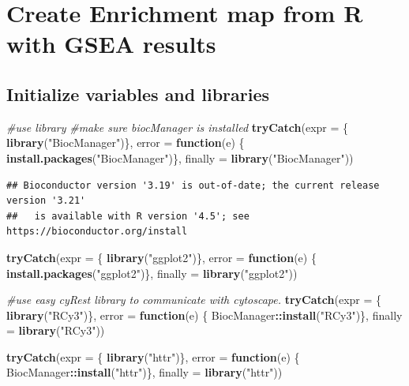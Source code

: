 \documentclass[
]{book}
\newenvironment{Shaded}{\begin{snugshade}}{\end{snugshade}}
\newcommand{\AttributeTok}[1]{\textcolor[rgb]{0.13,0.29,0.53}{#1}}
\newcommand{\CommentTok}[1]{\textcolor[rgb]{0.56,0.35,0.01}{\textit{#1}}}
\newcommand{\ControlFlowTok}[1]{\textcolor[rgb]{0.13,0.29,0.53}{\textbf{#1}}}
\newcommand{\FunctionTok}[1]{\textcolor[rgb]{0.13,0.29,0.53}{\textbf{#1}}}
\newcommand{\NormalTok}[1]{#1}
\newcommand{\SpecialCharTok}[1]{\textcolor[rgb]{0.81,0.36,0.00}{\textbf{#1}}}
\newcommand{\StringTok}[1]{\textcolor[rgb]{0.31,0.60,0.02}{#1}}
\begin{document}
\chapter{Create Enrichment map from R with GSEA results}\label{create-enrichment-map-from-r-with-gsea-results}

\section{Initialize variables and libraries}\label{initialize-variables-and-libraries}

\begin{Shaded}
\begin{Highlighting}[]
\CommentTok{\#use library}
\CommentTok{\#make sure biocManager is installed}
\FunctionTok{tryCatch}\NormalTok{(}\AttributeTok{expr =}\NormalTok{ \{ }\FunctionTok{library}\NormalTok{(}\StringTok{"BiocManager"}\NormalTok{)\}, }
         \AttributeTok{error =} \ControlFlowTok{function}\NormalTok{(e) \{ }
           \FunctionTok{install.packages}\NormalTok{(}\StringTok{"BiocManager"}\NormalTok{)\}, }
         \AttributeTok{finally =} \FunctionTok{library}\NormalTok{(}\StringTok{"BiocManager"}\NormalTok{))}
\end{Highlighting}
\end{Shaded}

\begin{verbatim}
## Bioconductor version '3.19' is out-of-date; the current release version '3.21'
##   is available with R version '4.5'; see https://bioconductor.org/install
\end{verbatim}

\begin{Shaded}
\begin{Highlighting}[]
\FunctionTok{tryCatch}\NormalTok{(}\AttributeTok{expr =}\NormalTok{ \{ }\FunctionTok{library}\NormalTok{(}\StringTok{"ggplot2"}\NormalTok{)\}, }
         \AttributeTok{error =} \ControlFlowTok{function}\NormalTok{(e) \{ }\FunctionTok{install.packages}\NormalTok{(}\StringTok{"ggplot2"}\NormalTok{)\}, }
         \AttributeTok{finally =} \FunctionTok{library}\NormalTok{(}\StringTok{"ggplot2"}\NormalTok{))}

\CommentTok{\#use easy cyRest library to communicate with cytoscape.}
\FunctionTok{tryCatch}\NormalTok{(}\AttributeTok{expr =}\NormalTok{ \{ }\FunctionTok{library}\NormalTok{(}\StringTok{"RCy3"}\NormalTok{)\}, }
         \AttributeTok{error =} \ControlFlowTok{function}\NormalTok{(e) \{ BiocManager}\SpecialCharTok{::}\FunctionTok{install}\NormalTok{(}\StringTok{"RCy3"}\NormalTok{)\}, }
         \AttributeTok{finally =} \FunctionTok{library}\NormalTok{(}\StringTok{"RCy3"}\NormalTok{))}

\FunctionTok{tryCatch}\NormalTok{(}\AttributeTok{expr =}\NormalTok{ \{ }\FunctionTok{library}\NormalTok{(}\StringTok{"httr"}\NormalTok{)\}, }
         \AttributeTok{error =} \ControlFlowTok{function}\NormalTok{(e) \{ BiocManager}\SpecialCharTok{::}\FunctionTok{install}\NormalTok{(}\StringTok{"httr"}\NormalTok{)\}, }
         \AttributeTok{finally =} \FunctionTok{library}\NormalTok{(}\StringTok{"httr"}\NormalTok{))}
\end{Highlighting}
\end{Shaded}
\end{document}
